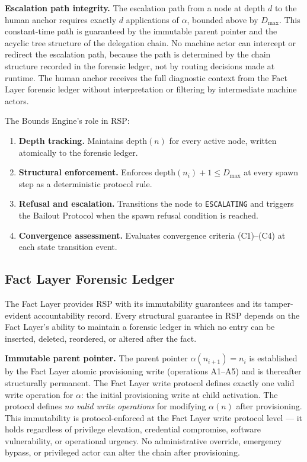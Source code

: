 \medskip
\noindent\textbf{Escalation path integrity.} The escalation path from a node at depth $d$ to the human anchor requires exactly $d$ applications of $\alpha$, bounded above by $D_{\max}$. This constant-time path is guaranteed by the immutable parent pointer and the acyclic tree structure of the delegation chain. No machine actor can intercept or redirect the escalation path, because the path is determined by the chain structure recorded in the forensic ledger, not by routing decisions made at runtime. The human anchor receives the full diagnostic context from the Fact Layer forensic ledger without interpretation or filtering by intermediate machine actors.

The Bounds Engine's role in RSP:

\begin{enumerate}
    \item[(BDE1)] \textbf{Depth tracking.} Maintains $\text{depth}(n)$ for every active node, written atomically to the forensic ledger.
    \item[(BDE2)] \textbf{Structural enforcement.} Enforces $\text{depth}(n_i) + 1 \leq D_{\max}$ at every spawn step as a deterministic protocol rule.
    \item[(BDE3)] \textbf{Refusal and escalation.} Transitions the node to \texttt{ESCALATING} and triggers the Bailout Protocol when the spawn refusal condition is reached.
    \item[(BDE4)] \textbf{Convergence assessment.} Evaluates convergence criteria (C1)--(C4) at each state transition event.
\end{enumerate}

\subsection{Fact Layer Forensic Ledger}
\label{sec:rs-fact-ledger}

The Fact Layer provides RSP with its immutability guarantees and its tamper-evident accountability record. Every structural guarantee in RSP depends on the Fact Layer's ability to maintain a forensic ledger in which no entry can be inserted, deleted, reordered, or altered after the fact.

\medskip
\noindent\textbf{Immutable parent pointer.} The parent pointer $\alpha(n_{i+1}) = n_i$ is established by the Fact Layer atomic provisioning write (operations A1--A5) and is thereafter structurally permanent. The Fact Layer write protocol defines exactly one valid write operation for $\alpha$: the initial provisioning write at child activation. The protocol defines \emph{no valid write operations} for modifying $\alpha(n)$ after provisioning. This immutability is protocol-enforced at the Fact Layer write protocol level --- it holds regardless of privilege elevation, credential compromise, software vulnerability, or operational urgency. No administrative override, emergency bypass, or privileged actor can alter the chain after provisioning.

